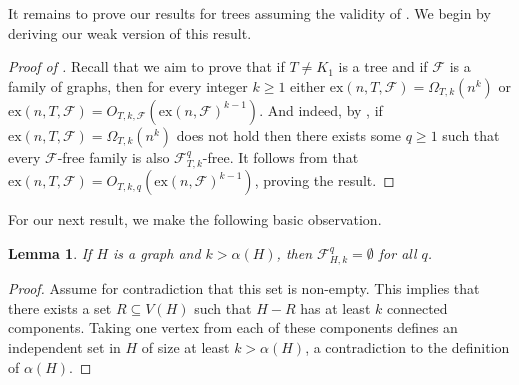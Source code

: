 \documentclass[12pt,letterpaper]{article}
\newtheorem{lemma}[theorem]{Lemma}
\theoremstyle{definition}
\newcommand{\ex}{\mathrm{ex}}
\renewcommand{\c}[1]{\mathcal{#1}}
\newcommand{\Om}{\Omega}
\newcommand{\al}{\alpha}
\newcommand{\sub}{\subseteq}
\begin{document}
	
	It remains to prove our results for trees assuming the validity of .  We begin by deriving our weak version of this result.
	\begin{proof}[Proof of ]
		Recall that we aim to prove that if $T\ne K_1$ is a tree and if $\c{F}$ is a family of graphs, then for every integer $k\ge 1$ either $\ex(n,T,\c{F})=\Om_{T,k}(n^k)$ or $\ex(n,T,\c{F})=O_{T,k,\c{F}}(\ex(n,\c{F})^{k-1})$.  And indeed, by , if $\ex(n,T,\c{F})=\Om_{T,k}(n^k)$ does not hold then there exists some $q\ge 1$ such that every $\c{F}$-free family is also $\c{F}_{T,k}^q$-free.  It follows from  that  $\ex(n,T,\c{F})=O_{T,k,q}(\ex(n,\c{F})^{k-1})$, proving the result.
	\end{proof}
	
	For our next result, we make the following basic observation.
	\begin{lemma}\label{lemma alpha empty}
		If $H$ is a graph and $k>\al(H)$, then $\c{F}_{H,k}^q=\emptyset$ for all $q$.
	\end{lemma}
	\begin{proof}
		Assume for contradiction that this set is non-empty.  This implies that there exists a set $R\sub V(H)$ such that $H-R$ has at least $k$ connected components.  Taking one vertex from each of these components defines an independent set in $H$ of size at least $k>\al(H)$, a contradiction to the definition of $\al(H)$.
	\end{proof}
	
\end{document}
